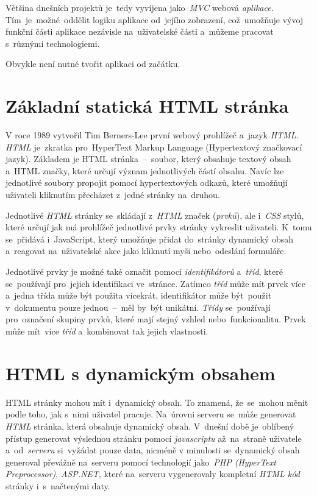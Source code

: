 \documentclass[11pt,a4paper]{report}
\begin{document}
        Většina dnešních projektů je~tedy vyvíjena jako~\emph{MVC} webová \emph{aplikace}. Tím~je~možné~oddělit logiku aplikace od~jejího zobrazení, což~umožňuje vývoj funkční části aplikace nezávisle na~uživatelské části a~můžeme pracovat s~různými technologiemi.
        
        Obvykle není nutné tvořit aplikaci od začátku. \cite{itnetworkBestPractices}

        \section{Základní statická HTML stránka}
            V roce 1989 vytvořil Tim Berners-Lee první webový prohlížeč a~jazyk \emph{HTML}. \emph{HTML} je~zkratka pro~HyperText Markup Language (Hypertextový značkovací jazyk). Základem je HTML stránka~--~soubor, který obsahuje textový obsah a~HTML značky, které určují význam jednotlivých částí obsahu. Navíc lze jednotlivé soubory propojit pomocí hypertextových odkazů, které umožňují uživateli kliknutím přecházet z~jedné stránky na~druhou.

            Jednotlivé \emph{HTML} stránky se~skládají z~\emph{HTML} značek (\emph{prvků}), ale i~\emph{CSS} stylů, které určují jak má prohlížeč jednotlivé prvky stránky vykreslit uživateli. K~tomu se~přidává i~JavaScript, který umožňuje přidat do~stránky dynamický obsah a~reagovat na~uživatelské akce jako kliknutí myši nebo~odeslání formuláře. \cite{berners:1989:proposal}

            Jednotlivé prvky je možné také označit pomocí \emph{identifikátorů} a~\emph{tříd}, které se~používají pro~jejich identifikaci ve~stránce. Zatímco \emph{tříd} může mít prvek více a~jedna třída může být použita vícekrát, identifikátor může být~použit v~dokumentu pouze jednou~--~měl by~být unikátní. \emph{Třídy} se~používají pro~označení skupiny prvků, které mají stejný vzhled nebo~funkcionalitu. Prvek může mít~více \emph{tříd} a~kombinovat tak jejich vlastnosti. \cite{jpw:tridy}

        \section{HTML s dynamickým obsahem}
            HTML stránky mohou mít i~dynamický obsah. To znamená, že~se~mohou měnit podle toho, jak s~nimi uživatel pracuje. Na~úrovni serveru se~může generovat \emph{HTML} stránka, která obsahuje dynamický obsah. V~dnešní době je~oblíbený přístup generovat výslednou stránku pomocí \emph{javascriptu} až~na~straně uživatele a~od~\emph{serveru} si~vyžádat pouze data, nicméně v minulosti se~dynamický obsah generoval převážně na~serveru pomocí technologií jako~\emph{PHP (HyperText Preprocessor)}, \emph{ASP.NET}, které na~serveru vygenerovaly kompletní \emph{HTML kód} stránky i~s~načtenými daty.
\end{document}
